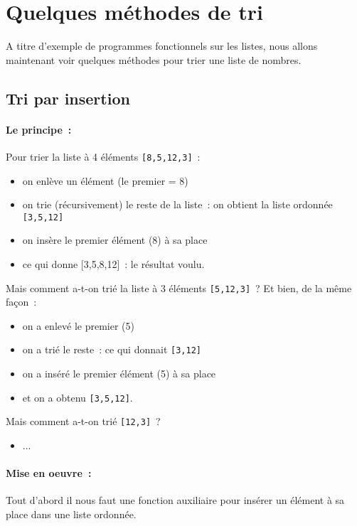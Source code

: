 \section{Quelques méthodes de tri}

A titre d'exemple de programmes fonctionnels sur les listes, nous allons maintenant voir quelques méthodes pour trier une liste de nombres.

\subsection{Tri par insertion}

\paragraph*{Le principe~:}  Pour trier la liste à 4 
éléments \verb+[8,5,12,3]+~:
\begin{itemize}
\item on enlève un élément (le premier = 8)
\item on trie
 (récursivement) le reste de la liste~: on obtient la liste ordonnée 
\verb+[3,5,12]+
\item on insère le premier élément (8) à sa place
\item ce qui donne [3,5,8,12]~: le résultat voulu.
\end{itemize}
	
Mais comment a-t-on trié la liste à 3 éléments \verb+[5,12,3]+~? Et bien, de la m\^eme fa\c{c}on~:
\begin{itemize}
\item on a enlevé le premier (5)
\item on a trié le reste~: ce qui donnait \verb+[3,12]+
\item on a inséré le premier élément (5) à sa place
\item et on a obtenu \verb+[3,5,12]+.
\end{itemize}

Mais comment a-t-on trié \verb+[12,3]+~?
\begin{itemize}
\item ...
\end{itemize}

\paragraph*{Mise en oeuvre~:} Tout d'abord il 
nous faut une fonction auxiliaire pour insérer un élément à sa place
dans une liste ordonnée.


